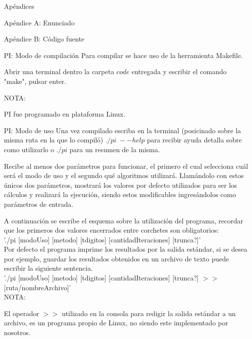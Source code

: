 \begin{section}{Apéndices}
	\begin{subsection}{Apéndice A: Enunciado}
		
	\end{subsection}
	\begin{subsection}{Apéndice B: Código fuente}
		\begin{subsection}{PI: Modo de compilación}
			Para compilar se hace uso de la herramienta Makefile.
			
			Abrir una terminal dentro la carpeta $code$ entregada y escribir el comando "make", pulsar enter.
			
			NOTA:
			
			PI fue programado en plataforma Linux.
		\end{subsection}	
		\begin{subsection}{PI: Modo de uso}
			Una vez compilado escriba en la terminal (posicinado sobre la misma ruta en la que lo compiló) $./pi \; --help$ para recibir ayuda detalla sobre como utilizarlo o $./pi$ para un resumen de la misma.
			
			Recibe al menos dos parámetros para funcionar, el primero el cual selecciona cuál será el modo de uso y el segundo qué algoritmos utilizará. Llamándolo con estos únicos dos parámetros, mostrará los valores por defecto utilizados para ser los cálculos y realizará la ejecución, siendo estos modificables ingresándolos como parámetros de entrada.

			A continuación se escribe el esquema sobre la utilización del programa, recordar que los primeros dos valores encerrados entre corchetes son obligatorios:\\
			'./pi [modoUso] [metodo] [tdigitos] [cantidadIteraciones] [trunca?]'\\	
					
			Por defecto el programa imprime los resultados por la salida estándar, si se desea por ejemplo, guardar los resultados obtenidos en un archivo de texto puede escribir la siguiente sentencia.\\
			
			'./pi [modoUso] [metodo] [tdigitos] [cantidadIteraciones] [trunca?] $>>$ [ruta/nombreArchivo]'\\
			NOTA:
			
			El operador $>>$ utilizado en la consola para redigir la salida estándar a un archivo, es un programa propio de Linux, no siendo este implementado por nosotros.
			
		\end{subsection}	
	\end{subsection}	
\end{section}
